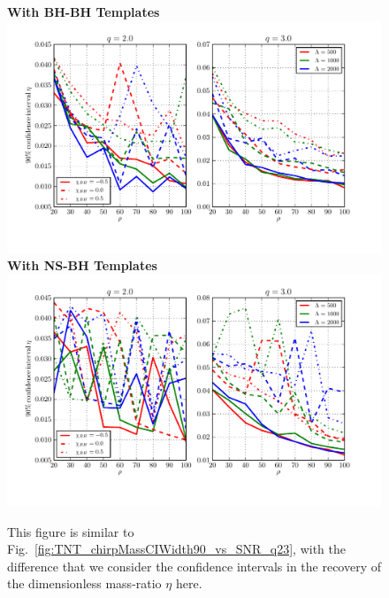 \documentclass[aps,prd,amsmath,floats,floatfix, twocolumn,
superscriptaddress,nofootinbib,showpacs]{revtex4-1}
\begin{document}
\begin{figure}[h]
	\centering    
	\textbf{With BH-BH Templates}
	\includegraphics[width=2\columnwidth]{plots/TN_EtaCIWidth90_vs_SNR_q23.pdf}\\ 
	\textbf{With NS-BH Templates}
	\includegraphics[width=2\columnwidth]{plots/TT_EtaCIWidth90_vs_SNR_q23.pdf}%
	\caption{This figure is similar to Fig.~\ref{fig:TNT_chirpMassCIWidth90_vs_SNR_q23},
		with the difference that we consider the confidence intervals in the recovery
		of the dimensionless
		mass-ratio $\eta$ here.}
	\label{fig:TNT_EtaCIWidth90_vs_SNR_q23}
\end{figure}
% 
\end{document}
